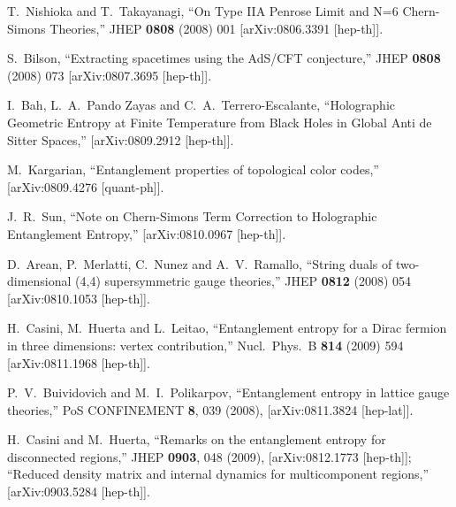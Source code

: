 \documentclass[12pt]{article}
\begin{document}
\begin{thebibliography}{99}
  T.~Nishioka and T.~Takayanagi,
  ``On Type IIA Penrose Limit and N=6 Chern-Simons Theories,''
  JHEP {\bf 0808} (2008) 001
  [arXiv:0806.3391 [hep-th]].

  S.~Bilson,
  ``Extracting spacetimes using the AdS/CFT conjecture,''
  JHEP {\bf 0808} (2008) 073
  [arXiv:0807.3695 [hep-th]].

  I.~Bah, L.~A.~Pando Zayas and C.~A.~Terrero-Escalante,
  ``Holographic Geometric Entropy at Finite Temperature from Black Holes in
  Global Anti de Sitter Spaces,''
  [arXiv:0809.2912 [hep-th]].

  M.~Kargarian,
  ``Entanglement properties of topological color codes,''
  [arXiv:0809.4276 [quant-ph]].

  J.~R.~Sun,
  ``Note on Chern-Simons Term Correction to Holographic Entanglement Entropy,''
  [arXiv:0810.0967 [hep-th]].

  D.~Arean, P.~Merlatti, C.~Nunez and A.~V.~Ramallo,
   ``String duals of two-dimensional (4,4) supersymmetric gauge theories,''
  JHEP {\bf 0812} (2008) 054
  [arXiv:0810.1053 [hep-th]].


  H.~Casini, M.~Huerta and L.~Leitao,
  ``Entanglement entropy for a Dirac fermion in three dimensions: vertex
  contribution,''
  Nucl.\ Phys.\  B {\bf 814} (2009) 594
  [arXiv:0811.1968 [hep-th]].

  P.~V.~Buividovich and M.~I.~Polikarpov,
  ``Entanglement entropy in lattice gauge theories,''
  PoS CONFINEMENT {\bf 8}, 039 (2008),
   [arXiv:0811.3824 [hep-lat]].

  H.~Casini and M.~Huerta,
  ``Remarks on the entanglement entropy for disconnected regions,''
   JHEP {\bf 0903}, 048 (2009),
  [arXiv:0812.1773 [hep-th]];
  ``Reduced density matrix and internal dynamics for multicomponent regions,''
  [arXiv:0903.5284 [hep-th]].



\end{thebibliography}
\end{document}
